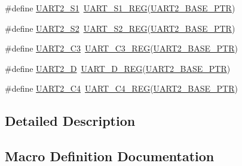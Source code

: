 \begin{DoxyCompactItemize}
\item 
\#define \hyperlink{group___u_a_r_t___register___accessor___macros_gad72d529c07a52334fce106564ba9aa54}{U\+A\+R\+T2\+\_\+\+S1}~\hyperlink{group___u_a_r_t___register___accessor___macros_gae94e819cfe08eebd802bc5d3c2bd4c05}{U\+A\+R\+T\+\_\+\+S1\+\_\+\+R\+EG}(\hyperlink{group___u_a_r_t___peripheral_ga75ca2ea4e490b3c1c7aa55fc9c25cd37}{U\+A\+R\+T2\+\_\+\+B\+A\+S\+E\+\_\+\+P\+TR})
\item 
\#define \hyperlink{group___u_a_r_t___register___accessor___macros_ga7d4831e8d28f59a12390b6e915c466d8}{U\+A\+R\+T2\+\_\+\+S2}~\hyperlink{group___u_a_r_t___register___accessor___macros_ga02efefc75cacb156375e2bff39a1f497}{U\+A\+R\+T\+\_\+\+S2\+\_\+\+R\+EG}(\hyperlink{group___u_a_r_t___peripheral_ga75ca2ea4e490b3c1c7aa55fc9c25cd37}{U\+A\+R\+T2\+\_\+\+B\+A\+S\+E\+\_\+\+P\+TR})
\item 
\#define \hyperlink{group___u_a_r_t___register___accessor___macros_gabf40e8391c305a9cfbd4a00ba732c5c8}{U\+A\+R\+T2\+\_\+\+C3}~\hyperlink{group___u_a_r_t___register___accessor___macros_ga94048a3faaadf9a76ac1e9ea865d7f4e}{U\+A\+R\+T\+\_\+\+C3\+\_\+\+R\+EG}(\hyperlink{group___u_a_r_t___peripheral_ga75ca2ea4e490b3c1c7aa55fc9c25cd37}{U\+A\+R\+T2\+\_\+\+B\+A\+S\+E\+\_\+\+P\+TR})
\item 
\#define \hyperlink{group___u_a_r_t___register___accessor___macros_ga92cfdefa4bbd5e6aceaad280e911b76b}{U\+A\+R\+T2\+\_\+D}~\hyperlink{group___u_a_r_t___register___accessor___macros_ga53bbf3e214fcc4cba0059aca0184ce6f}{U\+A\+R\+T\+\_\+\+D\+\_\+\+R\+EG}(\hyperlink{group___u_a_r_t___peripheral_ga75ca2ea4e490b3c1c7aa55fc9c25cd37}{U\+A\+R\+T2\+\_\+\+B\+A\+S\+E\+\_\+\+P\+TR})
\item 
\#define \hyperlink{group___u_a_r_t___register___accessor___macros_gae087e956683e43bc1a108d3a71bd2c5c}{U\+A\+R\+T2\+\_\+\+C4}~\hyperlink{group___u_a_r_t___register___accessor___macros_ga53f71f873e006d84f394f97bb65e5174}{U\+A\+R\+T\+\_\+\+C4\+\_\+\+R\+EG}(\hyperlink{group___u_a_r_t___peripheral_ga75ca2ea4e490b3c1c7aa55fc9c25cd37}{U\+A\+R\+T2\+\_\+\+B\+A\+S\+E\+\_\+\+P\+TR})
\end{DoxyCompactItemize}


\subsection{Detailed Description}


\subsection{Macro Definition Documentation}
